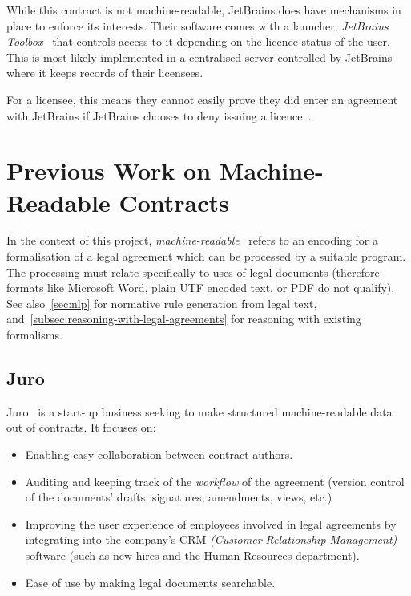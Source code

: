 While this contract is not machine-readable, JetBrains does have mechanisms in place to enforce its interests.
Their software comes with a launcher, \textit{JetBrains Toolbox}~\cite{jetbrainsToolbox} that controls access to it
depending on the licence status of the user.
This is most likely implemented in a centralised server controlled by JetBrains where it keeps records
of their licensees.

For a licensee, this means they cannot easily prove they did enter an agreement with JetBrains if JetBrains chooses
to deny issuing a licence~\citeTODO.


\section{Previous Work on Machine-Readable Contracts}\label{sec:machine-readable-contracts}

In the context of this project, \emph{machine-readable}~\cite{cambridgeMachineReadable, openDataMachineReadable} refers to an encoding for a formalisation of a legal agreement which can be processed by a suitable program.
The processing must relate specifically to uses of legal documents (therefore formats like Microsoft Word, plain UTF encoded text, or PDF do not qualify).\\

See also~\autoref{sec:nlp} for normative rule generation from legal text, and~\autoref{subsec:reasoning-with-legal-agreements} for reasoning with existing formalisms.

\subsection{Juro}\label{subsec:juro}
Juro~\cite{juroWhitepaper} is a start-up business seeking to make structured machine-readable data out of contracts.
It focuses on:
\begin{itemize}
    \item Enabling easy collaboration between contract authors.
    \item Auditing and keeping track of the \textit{workflow} of the agreement (version control of the documents'
    drafts, signatures, amendments, views, etc.)
    \item Improving the user experience of employees involved in legal agreements by integrating into the company's CRM
    \textit{(Customer Relationship Management)} software (such as new hires and the Human Resources department).
    \item Ease of use by making legal documents searchable.
\end{itemize}

